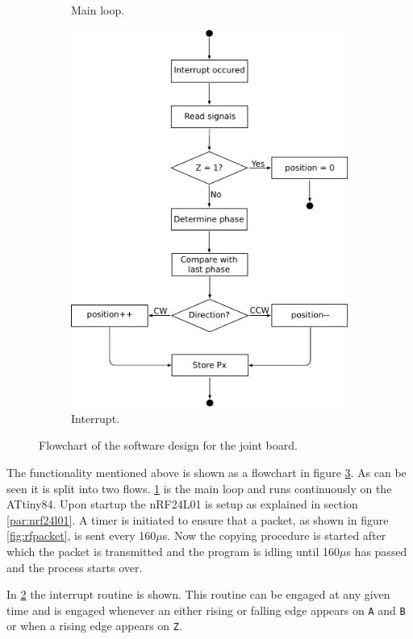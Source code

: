 {\begin{figure}[h]
\begin{subfigure}[b]{0.30\textwidth}
		\caption{Main loop.}
		\label{sfig:joint_main_flowchart}
	\end{subfigure}
	\begin{subfigure}[b]{0.69\textwidth}
		\centering
		\includegraphics[width=.8\linewidth]{graphics/joint_interrupt}
		\caption{Interrupt.}
		\label{sfig:joint_interrupt}
	\end{subfigure}
	\caption{Flowchart of the software design for the joint board.}
	\label{fig:joint_software}
\end{figure}

The functionality mentioned above is shown as a flowchart in figure \ref{fig:joint_software}.
As can be seen it is split into two flows.
\ref{sfig:joint_main_flowchart} is the main loop and runs continuously on the ATtiny84.
Upon startup the nRF24L01 is setup as explained in section \ref{par:nrf24l01}.
A timer is initiated to ensure that a packet, as shown in figure \ref{fig:rfpacket}, is sent every 160$\mu$s.
Now the copying procedure is started after which the packet is transmitted and the program is idling until 160$\mu$s has passed and the process starts over.

In \ref{sfig:joint_interrupt} the interrupt routine is shown.
This routine can be engaged at any given time and is engaged whenever an either rising or falling edge appears on \texttt{A} and \texttt{B} or when a rising edge appears on \texttt{Z}.

}
